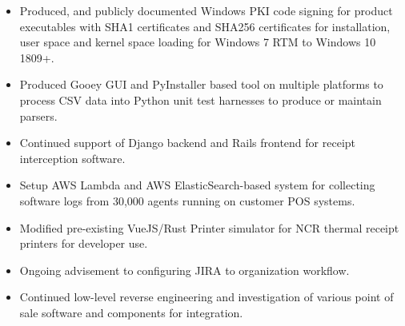 \documentclass[10pt,letter,ragged2e]{altacv}
\begin{document}
\begin{paracol}{2}
\begin{itemize}
\item Produced, and publicly documented Windows PKI code signing for product executables with SHA1 certificates and SHA256 certificates for installation, user space and kernel space loading for Windows 7 RTM to Windows 10 1809+.
\item Produced Gooey GUI and PyInstaller based tool on multiple platforms to process CSV data into Python unit test harnesses to produce or maintain parsers.
\item Continued support of Django backend and Rails frontend for receipt interception software.
\item Setup AWS Lambda and AWS ElasticSearch-based system for collecting software logs from 30,000 agents running on customer POS systems.
\item Modified pre-existing VueJS/Rust Printer simulator for NCR thermal receipt printers for developer use.
\item Ongoing advisement to configuring JIRA to organization workflow.
\item Continued low-level reverse engineering and investigation of various point of sale software and components for integration.
\end{itemize}

\divider



\end{paracol}
\end{document}
